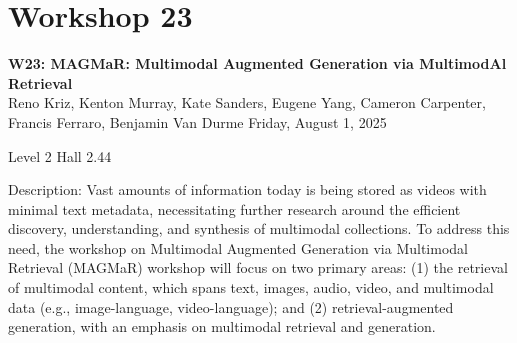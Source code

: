 \clearpage


\section[W23: MAGMaR: Multimodal Augmented Generation via MultimodAl Retrieval ]{Workshop 23}
\label{workshop_23}

\begin{center}
    {\Large \textbf{W23: MAGMaR: Multimodal Augmented Generation via MultimodAl Retrieval }}\\
    

Reno Kriz, Kenton Murray, Kate Sanders, Eugene Yang, Cameron Carpenter, Francis Ferraro, Benjamin Van Durme
    Friday, August 1, 2025

  Level 2 Hall 2.44
    
\end{center}

Description: Vast amounts of information today is being stored as videos with minimal text metadata, necessitating further research around the efficient discovery, understanding, and synthesis of multimodal collections. To address this need, the workshop on Multimodal Augmented Generation via Multimodal Retrieval (MAGMaR) workshop will focus on two primary areas: (1) the retrieval of multimodal content, which spans text, images, audio, video, and multimodal data (e.g., image-language, video-language); and (2) retrieval-augmented generation, with an emphasis on multimodal retrieval and generation.

